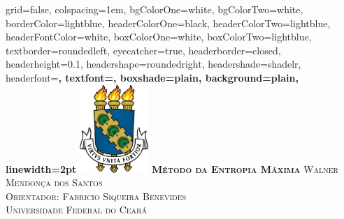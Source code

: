 \documentclass[portrait,final,a0paper,fontscale=0.277]{baposter}
\begin{document}






\begin{poster}%
  {
  grid=false,
  colspacing=1em,
  bgColorOne=white,
  bgColorTwo=white,
  borderColor=lightblue,
  headerColorOne=black,
  headerColorTwo=lightblue,
  headerFontColor=white,
  boxColorOne=white,
  boxColorTwo=lightblue,
  textborder=roundedleft,
  eyecatcher=true,
  headerborder=closed,
  headerheight=0.1\textheight,
  headershape=roundedright,
  headershade=shadelr,
  headerfont=\Large\bf\textsc, %
  textfont={\setlength{\parindent}{1.5em}},
  boxshade=plain,
  background=plain,
  linewidth=2pt
  }
  {%
    \includegraphics[height=9.0em]{images/Brasao_UFC}
  }
  {\bf\textsc{M\'{e}todo da Entropia M\'{a}xima}\vspace{0.5em}}
  {\textsc{ Walner Mendon\c{c}a dos Santos \\ \small{ Orientador: Fabricio Siqueira Benevides \\ Universidade Federal do Cear\'{a}}}}








\end{poster}
\end{document}
